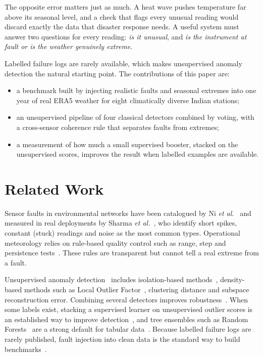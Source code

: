 \documentclass[conference]{IEEEtran}
\begin{document}
The opposite error matters just as much. A heat wave pushes temperature far above its seasonal
level, and a check that flags every unusual reading would discard exactly the data that disaster
response needs. A useful system must answer two questions for every reading: \emph{is it unusual},
and \emph{is the instrument at fault or is the weather genuinely extreme}.

Labelled failure logs are rarely available, which makes unsupervised anomaly detection the natural
starting point. The contributions of this paper are:
\begin{itemize}
\item a benchmark built by injecting realistic faults and seasonal extremes into one year of real
ERA5 weather for eight climatically diverse Indian stations;
\item an unsupervised pipeline of four classical detectors combined by voting, with a cross-sensor
coherence rule that separates faults from extremes;
\item a measurement of how much a small supervised booster, stacked on the unsupervised scores,
improves the result when labelled examples are available.
\end{itemize}

\section{Related Work}
Sensor faults in environmental networks have been catalogued by Ni \emph{et al.}~\cite{ni2009} and
measured in real deployments by Sharma \emph{et al.}~\cite{sharma2010}, who identify short spikes,
constant (stuck) readings and noise as the most common types. Operational meteorology relies on
rule-based quality control such as range, step and persistence tests~\cite{wmo2004,durre2010}. These
rules are transparent but cannot tell a real extreme from a fault.

Unsupervised anomaly detection~\cite{chandola2009} includes isolation-based methods~\cite{liu2008},
density-based methods such as Local Outlier Factor~\cite{breunig2000}, clustering distance and
subspace reconstruction error. Combining several detectors improves robustness~\cite{aggarwal2017}.
When some labels exist, stacking a supervised learner on unsupervised outlier scores is an
established way to improve detection~\cite{micenkova2014}, and tree ensembles such as Random
Forests~\cite{breiman2001} are a strong default for tabular data~\cite{grinsztajn2022}. Because
labelled failure logs are rarely published, fault injection into clean data is the standard way to
build benchmarks~\cite{sharma2010}.
\end{document}
